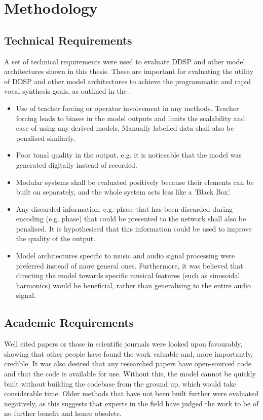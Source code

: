 \section{Methodology}

\subsection{Technical Requirements}

A set of technical requirements were used to evaluate DDSP and other model architectures shown in this thesis. These are important for evaluating the utility of DDSP and other model architectures to achieve the programmatic and rapid vocal synthesis goals, as outlined in the .

\begin{itemize}
    \item Use of teacher forcing or operator involvement in any methods. Teacher forcing leads to biases in the model outputs and limits the scalability and ease of using any derived models. Manually labelled data shall also be penalised similarly.
    \item Poor tonal quality in the output, e.g. it is noticeable that the model was generated digitally instead of recorded.
    \item Modular systems shall be evaluated positively because their elements can be built on separately, and the whole system acts less like a 'Black Box'.
    \item Any discarded information, e.g. phase that has been discarded during encoding (e.g. phase) that could be presented to the network shall also be penalised. It is hypothesised that this information could be used to improve the quality of the output.
    \item Model architectures specific to music and audio signal processing were preferred instead of more general ones. Furthermore, it was believed that directing the model towards specific musical features (such as sinusoidal harmonics) would be beneficial, rather than generalising to the entire audio signal.
\end{itemize}

\subsection{Academic Requirements}

Well cited papers or those in scientific journals were looked upon favourably, showing that other people have found the work valuable and, more importantly, credible. It was also desired that any researched papers have open-sourced code and that the code is available for use. Without this, the model cannot be quickly built without building the codebase from the ground up, which would take considerable time. Older methods that have not been built further were evaluated negatively, as this suggests that experts in the field have judged the work to be of no further benefit and hence obsolete.

